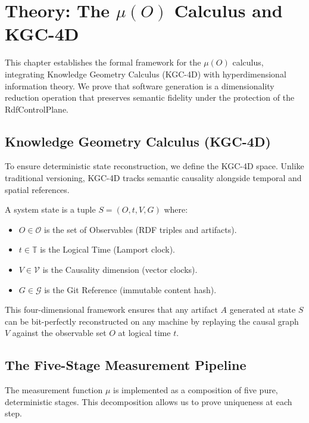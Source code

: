 \chapter{Theory: The $\mu(O)$ Calculus and KGC-4D}

This chapter establishes the formal framework for the $\mu(O)$ calculus, integrating Knowledge Geometry Calculus (KGC-4D) with hyperdimensional information theory. We prove that software generation is a dimensionality reduction operation that preserves semantic fidelity under the protection of the RdfControlPlane.

\section{Knowledge Geometry Calculus (KGC-4D)}

To ensure deterministic state reconstruction, we define the KGC-4D space. Unlike traditional versioning, KGC-4D tracks semantic causality alongside temporal and spatial references.

\begin{definition}
    A system state is a tuple $S = (O, t, V, G)$ where:
    \begin{itemize}
        \item $O \in \mathcal{O}$ is the set of Observables (RDF triples and artifacts).
        \item $t \in \mathbb{T}$ is the Logical Time (Lamport clock).
        \item $V \in \mathcal{V}$ is the Causality dimension (vector clocks).
        \item $G \in \mathcal{G}$ is the Git Reference (immutable content hash).
    \end{itemize}
\end{definition}

This four-dimensional framework ensures that any artifact $A$ generated at state $S$ can be bit-perfectly reconstructed on any machine by replaying the causal graph $V$ against the observable set $O$ at logical time $t$.

\section{The Five-Stage Measurement Pipeline}

The measurement function $\mu$ is implemented as a composition of five pure, deterministic stages. This decomposition allows us to prove uniqueness at each step.

